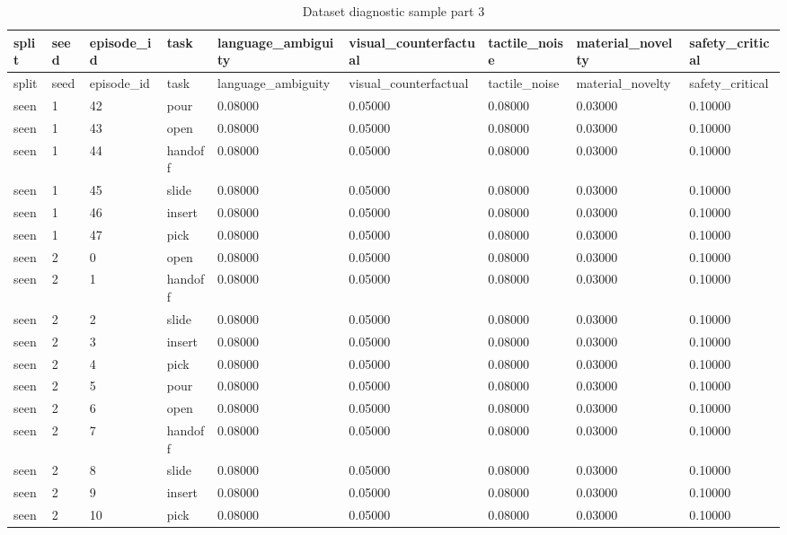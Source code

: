 \documentclass{article}
\begin{document}
\begin{center}
\tiny
\renewcommand{\arraystretch}{0.92}
\setlength{\tabcolsep}{3pt}
\begin{longtable}{lllllllll}
\caption{Dataset diagnostic sample part 3}\label{tab:dataset-diagnostic-sample-3}\\
\toprule
split & seed & episode\_id & task & language\_ambiguity & visual\_counterfactual & tactile\_noise & material\_novelty & safety\_critical \\
\midrule
\endfirsthead
\toprule
split & seed & episode\_id & task & language\_ambiguity & visual\_counterfactual & tactile\_noise & material\_novelty & safety\_critical \\
\midrule
\endhead
seen & 1 & 42 & pour & 0.08000 & 0.05000 & 0.08000 & 0.03000 & 0.10000 \\
seen & 1 & 43 & open & 0.08000 & 0.05000 & 0.08000 & 0.03000 & 0.10000 \\
seen & 1 & 44 & handoff & 0.08000 & 0.05000 & 0.08000 & 0.03000 & 0.10000 \\
seen & 1 & 45 & slide & 0.08000 & 0.05000 & 0.08000 & 0.03000 & 0.10000 \\
seen & 1 & 46 & insert & 0.08000 & 0.05000 & 0.08000 & 0.03000 & 0.10000 \\
seen & 1 & 47 & pick & 0.08000 & 0.05000 & 0.08000 & 0.03000 & 0.10000 \\
seen & 2 & 0 & open & 0.08000 & 0.05000 & 0.08000 & 0.03000 & 0.10000 \\
seen & 2 & 1 & handoff & 0.08000 & 0.05000 & 0.08000 & 0.03000 & 0.10000 \\
seen & 2 & 2 & slide & 0.08000 & 0.05000 & 0.08000 & 0.03000 & 0.10000 \\
seen & 2 & 3 & insert & 0.08000 & 0.05000 & 0.08000 & 0.03000 & 0.10000 \\
seen & 2 & 4 & pick & 0.08000 & 0.05000 & 0.08000 & 0.03000 & 0.10000 \\
seen & 2 & 5 & pour & 0.08000 & 0.05000 & 0.08000 & 0.03000 & 0.10000 \\
seen & 2 & 6 & open & 0.08000 & 0.05000 & 0.08000 & 0.03000 & 0.10000 \\
seen & 2 & 7 & handoff & 0.08000 & 0.05000 & 0.08000 & 0.03000 & 0.10000 \\
seen & 2 & 8 & slide & 0.08000 & 0.05000 & 0.08000 & 0.03000 & 0.10000 \\
seen & 2 & 9 & insert & 0.08000 & 0.05000 & 0.08000 & 0.03000 & 0.10000 \\
seen & 2 & 10 & pick & 0.08000 & 0.05000 & 0.08000 & 0.03000 & 0.10000 \\

\end{longtable}
\end{center}
\end{document}
